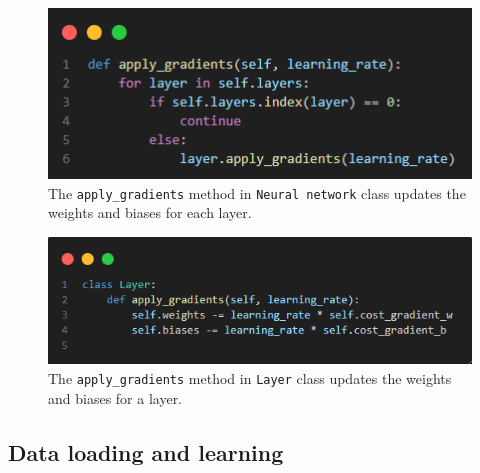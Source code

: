\documentclass{article}
\begin{document}
\begin{figure}[ht]
    \centering 
    \includegraphics[width=1\textwidth]{images/apply-gradients.png}
    \caption{The \texttt{apply\_gradients} method in \texttt{Neural network} class  updates the weights and biases for each layer.}
    \label{fig:apply_gradients}
\end{figure}

\begin{figure}[ht]
    \centering 
    \includegraphics[width=1\textwidth]{images/layer-gradient.png}
    \caption{The \texttt{apply\_gradients} method in \texttt{Layer} class updates the weights and biases for a layer.}
    \label{fig:apply_gradients_on_layer}
\end{figure}

\newpage
\subsection{Data loading and learning}
\end{document}
